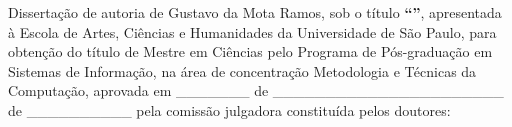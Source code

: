 \documentclass[
	12pt,				%
	oneside,			%
	a4paper,			%
	english,			%
	brazil				%
	]{abntex2ppgsi}
\begin{document}

\begin{folhadeaprovacao}
%
%
%
%
%
\noindent Dissertação de autoria de Gustavo da Mota Ramos, sob o título \textbf{``\imprimirtitulo''}, apresentada à Escola de Artes, Ciências e Humanidades da Universidade de São Paulo, para obtenção do título de Mestre em Ciências pelo Programa de Pós-graduação em Sistemas de Informação, na área de concentração Metodologia e Técnicas da Computação, aprovada em \_\_\_\_\_\_\_ de \_\_\_\_\_\_\_\_\_\_\_\_\_\_\_\_\_\_\_\_\_\_ de \_\_\_\_\_\_\_\_\_\_ pela comissão julgadora constituída pelos doutores:

\vspace*{3cm}


\end{folhadeaprovacao}
\end{document}
